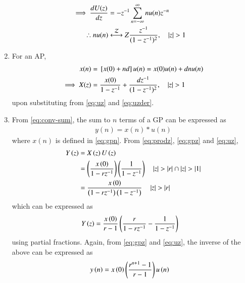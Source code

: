 \documentclass[journal,12pt,onecolumn]{IEEEtran}
\begin{document}
\begin{enumerate}
\begin{align}
	\\
\implies	\frac{dU(z)}{dz} &= -{z}^{-1} \sum_{n = -\infty}^{\infty} nu(n) z^{-n}\\
\therefore	nu(n) &\overset{\mathcal{Z}}{\longleftrightarrow}{Z}\frac{z^{-1}}{(1-z^{-1})^{2}}, \quad \left\vert z\right\vert > 1 
	       \label{eq:uzder}
\end{align}
\item For an AP, 
\begin{align}
	x(n) &= {}\left[x(0) + nd\right] u(n) = x(0)u(n) + dnu(n)  \\
	\implies X(z) &= \frac{x(0)}{1-z^{-1}} + \frac{dz^{-1}}{(1-z^{-1})^{2}}, \quad \left\vert z\right\vert > 1 
	       \label{eq:apz}
\end{align}
upon substituting from 
	       \eqref{eq:uz}
	       and
	       \eqref{eq:uzder}.
\item From 
	\eqref{eq:conv-sum},  the sum to $n$ terms  of a GP can be expressed as
\begin{align}
	y(n) = x(n)*u(n) 
\end{align}
		where $x(n)$ is defined in 
	       \eqref{eq:gpn}.
From \eqref{eq:prodz}, \eqref{eq:gpz} and \eqref{eq:uz},
\begin{align}
	Y\left(z\right)&= X\left(z\right) U\left(z\right)
	\\
	&=\left(\frac{x\left(0\right)}{1-rz^{-1}}\right)\left(\frac{1}{1-z^{-1}}\right) \quad \left\vert z\right\vert > \left\vert r\right\vert \cap \left\vert z\right\vert>\left\vert1\right\vert
	\\
	&=\frac{x\left(0\right)}{\left(1-rz^{-1}\right)\left(1-z^{-1}\right)} \quad \left\vert z\right\vert > \left\vert r\right\vert 
\end{align}
which can be expressed as
\begin{align}
	Y\left(z\right)&=\frac{x\left(0\right)}{r-1}\left(\frac{r}{1-rz^{-1}} - \frac{1}{1-z^{-1}}\right)
\end{align}
using partial fractions.  Again, from \eqref{eq:gpz} and \eqref{eq:uz}, the inverse of the above can be expressed as
\begin{align}
	y\left(n\right)
	&=x\left(0\right)\left(\frac{r^{n+1}-1}{r-1}\right)u\left(n\right)
\end{align}


\end{enumerate}
\end{document}
